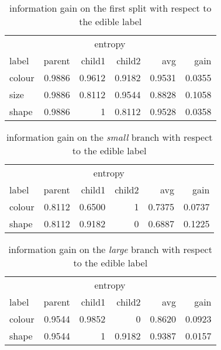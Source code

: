 \documentclass[11pt]{article}
\begin{document}
\begin{table}[ht]\footnotesize
\begin{tabular}{ l r r r r r }
& \multicolumn{4}{c}{entropy} & \\
\cline{2-5}
label & parent & child1 & child2 & avg & gain \\
\hline
colour & 0.9886 & 0.9612 & 0.9182 & 0.9531 & 0.0355 \\
size & 0.9886 & 0.8112 & 0.9544 & 0.8828 & 0.1058 \\
shape & 0.9886 & 1 & 0.8112 & 0.9528 & 0.0358 \\
\end{tabular}
\caption{information gain on the first split with respect to the edible label}
\label{tab:gain}
\end{table}



\begin{table}[ht]\footnotesize
\begin{tabular}{ l r r r r r }
& \multicolumn{4}{c}{entropy} & \\
\cline{2-5}
label & parent & child1 & child2 & avg & gain \\
\hline
colour & 0.8112 & 0.6500 & 1 & 0.7375 & 0.0737 \\
shape & 0.8112 & 0.9182 & 0 & 0.6887 & 0.1225 \\
\end{tabular}
\caption{information gain on the \emph{small} branch with respect to the edible label}
\label{tab:gain-small}
\end{table}

\begin{table}[ht]\footnotesize
\begin{tabular}{ l r r r r r }
& \multicolumn{4}{c}{entropy} & \\
\cline{2-5}
label & parent & child1 & child2 & avg & gain \\
\hline
colour & 0.9544 & 0.9852 & 0 & 0.8620 & 0.0923 \\
shape & 0.9544 & 1 & 0.9182 & 0.9387 & 0.0157 \\
\end{tabular}
\caption{information gain on the \emph{large} branch with respect to the edible label}
\label{tab:gain-large}
\end{table}
\end{document}
